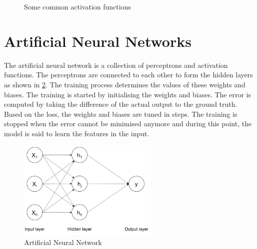 \documentclass[a4paper, 12pt, oneside, BCOR1cm,toc=chapterentrywithdots]{scrbook}
\begin{document}
\begin{figure}[h]
\caption{Some common activation functions}
\label{fig:act}
\end{figure}


 

\section{Artificial Neural Networks}

The artificial neural network is a collection of perceptrons and activation functions. The perceptrons are connected to each other to form the hidden layers as shown in \ref{fig:pic7}. The training process determines the values of these weights and biases. The training is started by initialising the weights and biases. The error is computed by taking the difference of the actual output to the ground truth. Based on the loss, the weights and biases are tuned in steps. The training is stopped when the error cannot be minimised anymore and during this point, the model is said to learn the features in the input.


\begin{figure}[h]
\centering
\includegraphics[width=0.6\textwidth]{image7.png}
\caption{Artificial Neural Network}
\label{fig:pic7}
\end{figure}
\end{document}
